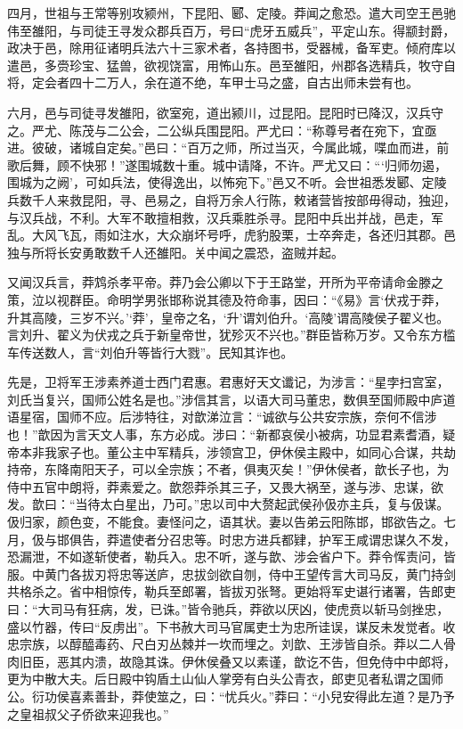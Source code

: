 \documentclass[12pt,UTF8]{ctexbook}
\begin{document}
四月，世祖与王常等别攻颍州，下昆阳、郾、定陵。莽闻之愈恐。遣大司空王邑驰伟至雒阳，与司徒王寻发众郡兵百万，号曰“虎牙五威兵”，平定山东。得颛封爵，政决于邑，除用征诸明兵法六十三家术者，各持图书，受器械，备军吏。倾府库以遣邑，多赍珍宝、猛兽，欲视饶富，用怖山东。邑至雒阳，州郡各选精兵，牧守自将，定会者四十二万人，余在道不绝，车甲士马之盛，自古出师未尝有也。



六月，邑与司徒寻发雒阳，欲室宛，道出颍川，过昆阳。昆阳时已降汉，汉兵守之。严尤、陈茂与二公会，二公纵兵围昆阳。严尤曰：“称尊号者在宛下，宜亟进。彼破，诸城自定矣。”邑曰：“百万之师，所过当灭，今属此城，喋血而进，前歌后舞，顾不快邪！”遂围城数十重。城中请降，不许。严尤又曰：“‘归师勿遏，围城为之阙’，可如兵法，使得逸出，以怖宛下。”邑又不听。会世祖悉发郾、定陵兵数千人来救昆阳，寻、邑易之，自将万余人行陈，敕诸营皆按部毋得动，独迎，与汉兵战，不利。大军不敢擅相救，汉兵乘胜杀寻。昆阳中兵出并战，邑走，军乱。大风飞瓦，雨如注水，大众崩坏号呼，虎豹股栗，士卒奔走，各还归其郡。邑独与所将长安勇敢数千人还雒阳。关中闻之震恐，盗贼并起。



又闻汉兵言，莽鸩杀孝平帝。莽乃会公卿以下于王路堂，开所为平帝请命金滕之策，泣以视群臣。命明学男张邯称说其德及符命事，因曰：“《易》言‘伏戎于莽，升其高陵，三岁不兴。’‘莽’，皇帝之名，‘升’谓刘伯升。‘高陵’谓高陵侯子翟义也。言刘升、翟义为伏戎之兵于新皇帝世，犹殄灭不兴也。”群臣皆称万岁。又令东方槛车传送数人，言“刘伯升等皆行大戮”。民知其诈也。



先是，卫将军王涉素养道士西门君惠。君惠好天文谶记，为涉言：“星孛扫宫室，刘氏当复兴，国师公姓名是也。”涉信其言，以语大司马董忠，数俱至国师殿中庐道语星宿，国师不应。后涉特往，对歆涕泣言：“诚欲与公共安宗族，奈何不信涉也！”歆因为言天文人事，东方必成。涉曰：“新都哀侯小被病，功显君素耆酒，疑帝本非我家子也。董公主中军精兵，涉领宫卫，伊休侯主殿中，如同心合谋，共劫持帝，东降南阳天子，可以全宗族；不者，俱夷灭矣！”伊休侯者，歆长子也，为侍中五官中朗将，莽素爱之。歆怨莽杀其三子，又畏大祸至，遂与涉、忠谋，欲发。歆曰：“当待太白星出，乃可。”忠以司中大赘起武侯孙伋亦主兵，复与伋谋。伋归家，颜色变，不能食。妻怪问之，语其状。妻以告弟云阳陈邯，邯欲告之。七月，伋与邯俱告，莽遣使者分召忠等。时忠方进兵都肄，护军王咸谓忠谋久不发，恐漏泄，不如遂斩使者，勒兵入。忠不听，遂与歆、涉会省户下。莽令恽责问，皆服。中黄门各拔刃将忠等送庐，忠拔剑欲自刎，侍中王望传言大司马反，黄门持剑共格杀之。省中相惊传，勒兵至郎署，皆拔刃张弩。更始将军史谌行诸署，告郎吏曰：“大司马有狂病，发，已诛。”皆令驰兵，莽欲以厌凶，使虎贲以斩马剑挫忠，盛以竹器，传曰“反虏出”。下书赦大司马官属吏士为忠所诖误，谋反未发觉者。收忠宗族，以醇醯毒药、尺白刃丛棘并一坎而埋之。刘歆、王涉皆自杀。莽以二人骨肉旧臣，恶其内溃，故隐其诛。伊休侯叠又以素谨，歆讫不告，但免侍中中郎将，更为中散大夫。后日殿中钩盾土山仙人掌旁有白头公青衣，郎吏见者私谓之国师公。衍功侯喜素善卦，莽使筮之，曰：“忧兵火。”莽曰：“小兒安得此左道？是乃予之皇祖叔父子侨欲来迎我也。”
\end{document}
